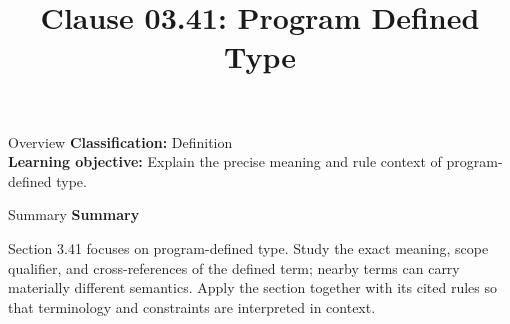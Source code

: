 \documentclass[10pt,letterpaper]{article}
\title{Clause 03.41: Program Defined Type}
\author{}
\date{}
\begin{document}
\maketitle
\begin{CornellOverviewBox}{Overview}
\textbf{Classification:} Definition\\[2pt]
\textbf{Learning objective:} Explain the precise meaning and rule context of program-defined type.
\end{CornellOverviewBox}\begin{CornellSummaryBox}{Summary}
{\sffamily\bfseries\color{Accent} Summary}\par\vspace{3pt}Section 3.41 focuses on program-defined type. Study the exact meaning, scope qualifier, and cross-references of the defined term; nearby terms can carry materially different semantics. Apply the section together with its cited rules so that terminology and constraints are interpreted in context.
\end{CornellSummaryBox}
\end{document}
